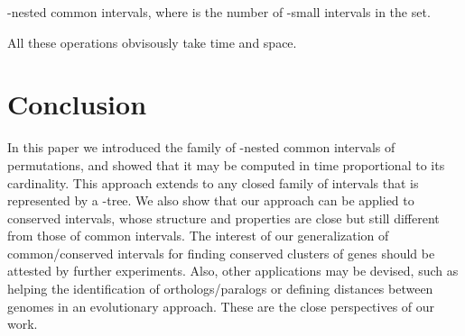 \documentclass{article}
\begin{document}
-nested common intervals, where  is the number of -small intervals in the set.

All these operations  obvisously take  time and space.

\section{Conclusion}\label{sect:conclusion}
In this paper we introduced the family of -nested common intervals
of  permutations, and showed that it may be computed in time
proportional to its cardinality. This approach extends to any
closed family of intervals that is represented by a -tree. We also
show that our approach can be applied to conserved intervals, whose
structure and properties are close but still different from those of common
intervals. The interest of our generalization of common/conserved intervals 
for finding conserved clusters of genes should be attested by further experiments.
Also, other applications may be devised, such as helping the identification of
orthologs/paralogs or defining distances between genomes in an
evolutionary approach. These are the close perspectives of our work.
\end{document}
